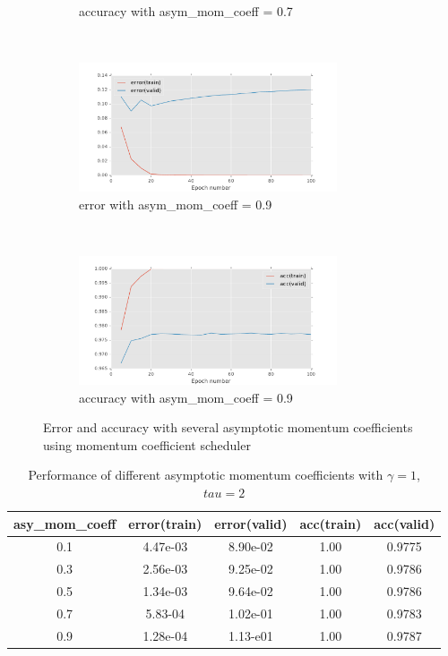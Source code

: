 \documentclass[11pt]{article}
\begin{document}
\begin{figure}[t!]
\begin{subfigure}[t]{0.45\textwidth}
        \caption{accuracy with asym\_mom\_coeff = 0.7}
    \end{subfigure}
    ~ 
    \begin{subfigure}[t]{0.45\textwidth}
        \centering
        \includegraphics[height=1.5in]{error_with_asy_mom_0_9.pdf}
        \caption{error with asym\_mom\_coeff = 0.9}
    \end{subfigure}   
    ~
    \begin{subfigure}[t]{0.45\textwidth}
        \centering
        \includegraphics[height=1.5in]{acc_with_asy_mom_0_9.pdf}
        \caption{accuracy with asym\_mom\_coeff = 0.9}
    \end{subfigure}
    \caption{Error and accuracy with several asymptotic momentum coefficients using momentum coefficient scheduler}    
    \label{fig:asy_mom}
\end{figure}


\begin{table}
\begin{center}
\begin{tabular}{ c c c c c} 
\hline
asy\_mom\_coeff & error(train) & error(valid) & acc(train) & acc(valid)\\
\hline
\hline
0.1& 4.47e-03 & 8.90e-02 & 1.00 & 0.9775 \\ 
0.3 & 2.56e-03 & 9.25e-02 & 1.00 & 0.9786 \\ 
0.5 & 1.34e-03 & 9.64e-02 & 1.00 & 0.9786 \\ 
0.7 & 5.83-04 & 1.02e-01 & 1.00 & 0.9783 \\
0.9  &  1.28e-04 & 1.13-e01 & 1.00 & 0.9787 \\
\end{tabular}
\caption{Performance of different asymptotic momentum coefficients with $\gamma = 1$, $tau=2$}
\label{tb:asy_mom}
\end{center}	
\end{table}
\end{document}
